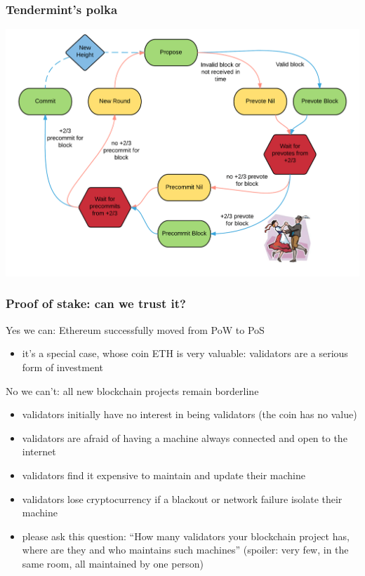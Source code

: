\documentclass[11pt]{beamer}  %
\begin{document}
\begin{frame}\frametitle{Tendermint's polka}

  \begin{center}
    \includegraphics[scale=.15,clip=false]{pictures/polka.png}
  \end{center}

\end{frame}

\begin{frame}\frametitle{Proof of stake: can we trust it?}

  \begin{greenbox}{Yes we can: Ethereum successfully moved from PoW to PoS}
    \begin{itemize}
    \item it's a special case, whose coin ETH is very valuable: validators are a serious form of investment
    \end{itemize}
  \end{greenbox}

  \bigskip
  
  \begin{redbox}{No we can't: all new blockchain projects remain borderline}
    \begin{itemize}
    \item validators initially have no interest in being validators (the coin has no value)
    \item validators are afraid of having a machine always connected and open to the internet
    \item validators find it expensive to maintain and update their machine
    \item validators lose cryptocurrency if a blackout or network failure isolate their machine
    \item please ask this question: ``How many validators your blockchain project has, where are they and who maintains such machines'' (spoiler: very few, in the same room, all maintained by one person)
    \end{itemize}
  \end{redbox}

\end{frame}
\end{document}
